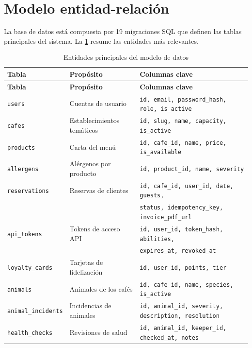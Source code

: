 \documentclass[12pt,a4paper,twoside,openright]{report}
\begin{document}
\section{Modelo entidad-relación}
\label{sec:er}

La base de datos está compuesta por 19 migraciones SQL que definen las tablas
principales del sistema. La \cref{tab:entidades} resume las entidades más relevantes.

\begin{longtable}{@{}lp{5cm}p{5cm}@{}}
  \caption{Entidades principales del modelo de datos}
  \label{tab:entidades}\\
  \toprule
  \textbf{Tabla} & \textbf{Propósito} & \textbf{Columnas clave}\\
  \midrule
  \endfirsthead
  \toprule
  \textbf{Tabla} & \textbf{Propósito} & \textbf{Columnas clave}\\
  \midrule
  \endhead
  \bottomrule
  \endfoot
  \texttt{users}
    & Cuentas de usuario
    & \texttt{id, email, password\_hash, role, is\_active}\\
  \texttt{cafes}
    & Establecimientos temáticos
    & \texttt{id, slug, name, capacity, is\_active}\\
  \texttt{products}
    & Carta del menú
    & \texttt{id, cafe\_id, name, price, is\_available}\\
  \texttt{allergens}
    & Alérgenos por producto
    & \texttt{id, product\_id, name, severity}\\
  \texttt{reservations}
    & Reservas de clientes
    & \texttt{id, cafe\_id, user\_id, date, guests,}\\
    & & \texttt{status, idempotency\_key, invoice\_pdf\_url}\\
  \texttt{api\_tokens}
    & Tokens de acceso API
    & \texttt{id, user\_id, token\_hash, abilities,}\\
    & & \texttt{expires\_at, revoked\_at}\\
  \texttt{loyalty\_cards}
    & Tarjetas de fidelización
    & \texttt{id, user\_id, points, tier}\\
  \texttt{animals}
    & Animales de los cafés
    & \texttt{id, cafe\_id, name, species, is\_active}\\
  \texttt{animal\_incidents}
    & Incidencias de animales
    & \texttt{id, animal\_id, severity, description, resolution}\\
  \texttt{health\_checks}
    & Revisiones de salud
    & \texttt{id, animal\_id, keeper\_id, checked\_at, notes}\\

\end{longtable}
\end{document}
